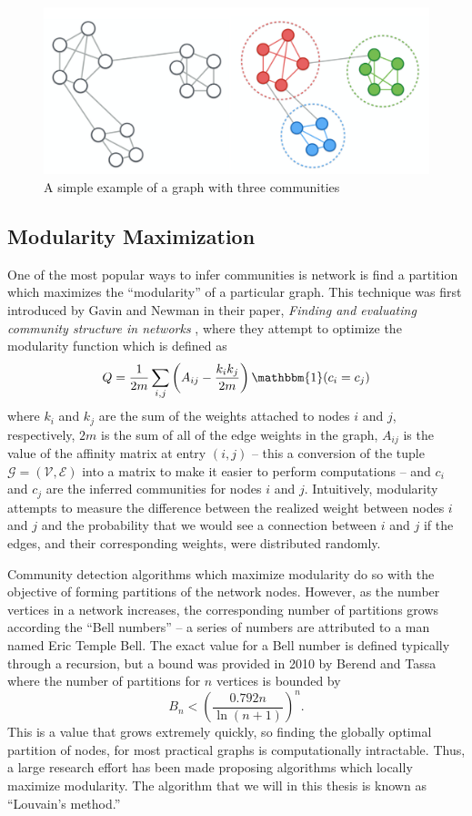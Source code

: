 \documentclass[../thesis.tex]{subfiles}
\begin{document}
\begin{figure}
    \centering
    \includegraphics[width=.7\linewidth]{images/comm_detection.pdf}
    \caption[Simple Community Detection Example]{A simple example of a graph with three communities}
    \label{fig:simple_cd}
\end{figure}

\subsection{Modularity Maximization}
\label{modularity-max}
One of the most popular ways to infer communities is network is find a partition which maximizes the ``modularity'' of a particular graph. This technique was first introduced by Gavin and Newman in their paper, \textit{Finding and evaluating community structure in networks} \cite{newman2004finding}, where they attempt to optimize the modularity function which is defined as
\begin{equation}
    Q = \frac{1}{2m} \sum_{i,j} \left(A_{ij} - \frac{k_i k_j}{2m} \right)\mathbbm{1}(c_i = c_j)
\end{equation}
where $k_i$ and $k_j$ are the sum of the weights attached to nodes $i$ and $j$, respectively, $2m$ is the sum of all of the edge weights in the graph, $A_{ij}$ is the value of the affinity matrix at entry $(i, j)$ -- this a conversion of the tuple $\mathcal{G} = (\mathcal{V}, \mathcal{E})$ into a matrix to make it easier to perform computations -- and $c_i$ and $c_j$ are the inferred communities for nodes $i$ and $j$. Intuitively, modularity attempts to measure the difference between the realized weight between nodes $i$ and $j$ and the probability that we would see a connection between $i$ and $j$ if the edges, and their corresponding weights, were distributed randomly.

Community detection algorithms which maximize modularity do so with the objective of forming partitions of the network nodes. However, as the number vertices in a network increases, the corresponding number of partitions grows according the ``Bell numbers'' -- a series of numbers are attributed to a man named Eric Temple Bell. The exact value for a Bell number is defined typically through a recursion, but a bound was provided in 2010 by Berend and Tassa \cite{berend2010improved} where the number of partitions for $n$ vertices is bounded by
\begin{equation}
    B_n < \left(\frac{0.792n}{\ln(n + 1)} \right)^n.
\end{equation}
This is a value that grows extremely quickly, so finding the globally optimal partition of nodes, for most practical graphs is computationally intractable. Thus, a large research effort has been made proposing algorithms which locally maximize modularity. The algorithm that we will in this thesis is known as ``Louvain's method.''
\end{document}
